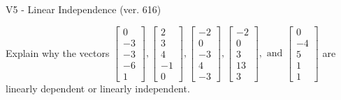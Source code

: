 \begin{exercise}
  \begin{exerciseTitle}V5 - Linear Independence (ver. 616)\end{exerciseTitle}
  \begin{exerciseStatement}
    Explain why the vectors \(\left[\begin{array}{r}
0 \\
-3 \\
-3 \\
-6 \\
1
\end{array}\right] , \left[\begin{array}{r}
2 \\
3 \\
4 \\
-1 \\
0
\end{array}\right] , \left[\begin{array}{r}
-2 \\
0 \\
-3 \\
4 \\
-3
\end{array}\right] , \left[\begin{array}{r}
-2 \\
0 \\
3 \\
13 \\
3
\end{array}\right] , \text{ and } \left[\begin{array}{r}
0 \\
-4 \\
5 \\
1 \\
1
\end{array}\right]\) are linearly dependent or linearly independent.	



\end{exerciseStatement}
\end{exercise}
